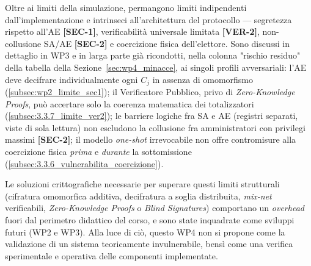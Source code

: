 Oltre ai limiti della simulazione, permangono limiti indipendenti dall'implementazione e intrinseci all'architettura del protocollo — segretezza rispetto all'AE \textbf{[SEC-1]}, verificabilità universale limitata \textbf{[VER-2]}, non-collusione SA/AE \textbf{[SEC-2]} e coercizione fisica dell'elettore. Sono discussi in dettaglio in WP3 e in larga parte già ricondotti, nella colonna "rischio residuo" della tabella della Sezione~\ref{sec:wp4_minacce}, ai singoli profili avversariali: l'AE deve decifrare individualmente ogni $C_j$ in assenza di omomorfismo (\ref{subsec:wp2_limite_sec1}); il Verificatore Pubblico, privo di \emph{Zero-Knowledge Proofs}, può accertare solo la coerenza matematica dei totalizzatori (\ref{subsec:3.3.7_limite_ver2}); le barriere logiche fra SA e AE (registri separati, viste di sola lettura) non escludono la collusione fra amministratori con privilegi massimi \textbf{[SEC-2]}; il modello \emph{one-shot} irrevocabile non offre contromisure alla coercizione fisica \emph{prima} e \emph{durante} la sottomissione (\ref{subsec:3.3.6_vulnerabilita_coercizione}).

Le soluzioni crittografiche necessarie per superare questi limiti strutturali (cifratura omomorfica additiva, decifratura a soglia distribuita, \emph{mix-net} verificabili, \emph{Zero-Knowledge Proofs} o \emph{Blind Signatures}) comportano un \emph{overhead} fuori dal perimetro didattico del corso, e sono state inquadrate come sviluppi futuri (WP2 e WP3). Alla luce di ciò, questo WP4 non si propone come la validazione di un sistema teoricamente invulnerabile, bensì come una verifica sperimentale e operativa delle componenti implementate.
